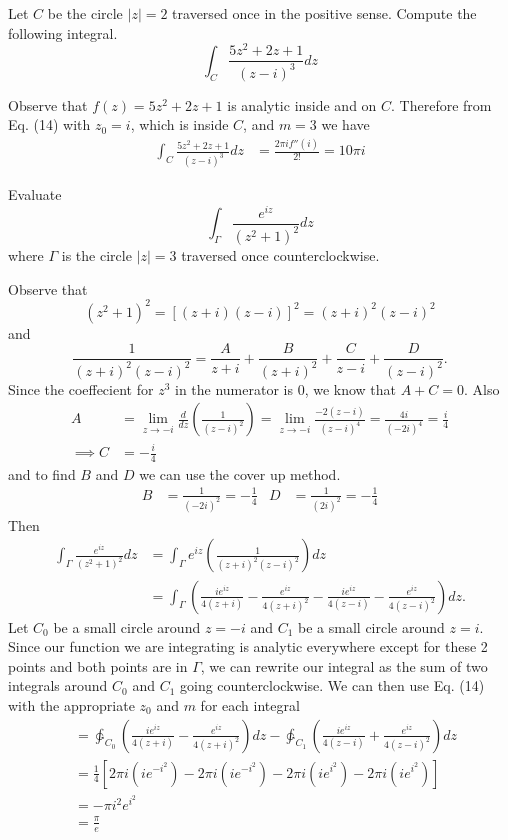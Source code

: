 \documentclass[12pt]{article}
\author{Warren Atkison}
\date{\today}
\newenvironment{exercise}[2][Exercise]{\begin{trivlist}
\item[\hskip \labelsep {\bfseries #1} \hskip \labelsep {\bfseries #2.}]}{\end{trivlist}}
\begin{document}
\fancyhf{}
\fancyhead[R]{\today}
\fancyfoot[R]{\thepage}

\begin{exercise}{3d}
	Let $C$ be the circle $|z| = 2$ traversed once in the positive sense. Compute the following integral.
	\[
		\int_{C} \frac{5z^2 + 2z + 1}{(z - i)^3}dz
	\]
\end{exercise}
Observe that $f(z) = 5z^2 + 2z + 1$ is analytic inside and on $C$. Therefore from Eq. (14) with $z_0 = i$, which is inside $C$, and $m = 3$ we have
\begin{align*}
	\int_{C} \frac{5z^2 + 2z + 1}{(z - i)^3}dz &= \frac{2\pi if''(i)}{2!} = 10\pi i
\end{align*}
\begin{exercise}{6}
	Evaluate
	\[
		\int_{\Gamma} \frac{e^{iz}}{\left(z^2 + 1\right)^2}dz
	\]
	where $\Gamma$ is the circle $|z| = 3$ traversed once counterclockwise.
\end{exercise}
Observe that
\[
	\left(z^2 + 1\right)^2 = \left[(z + i)(z - i)\right]^2 = (z + i)^2(z - i)^2
\]
and
\[
	\frac{1}{(z+i)^2(z-i)^2} = \frac{A}{z + i} + \frac{B}{(z + i)^2} + \frac{C}{z - i} + \frac{D}{(z - i)^2}.
\]
Since the coeffecient for $z^3$ in the numerator is 0, we know that $A + C = 0$. Also
\begin{align*}
	A &= \lim_{z \to -i} \frac{d}{dz}\left(\frac{1}{(z - i)^2}\right) = \lim_{z \to -i} \frac{-2(z - i)}{(z - i)^4} = \frac{4i}{(-2i)^4} = \frac{i}{4} \\
	\implies C &= -\frac{i}{4}
\end{align*}
and to find $B$ and $D$ we can use the cover up method.
\begin{align*}
	B &= \frac{1}{(-2i)^2} = -\frac{1}{4} & D &= \frac{1}{(2i)^2} = -\frac{1}{4}
\end{align*}
Then
\begin{align*}
	\int_{\Gamma} \frac{e^{iz}}{\left(z^2 + 1\right)^2}dz &= \int_{\Gamma} e^{iz}\left(\frac{1}{(z + i)^2(z - i)^2}\right)dz \\
							      &= \int_{\Gamma} \left(\frac{ie^{iz}}{4(z + i)} - \frac{e^{iz}}{4(z + i)^2} - \frac{ie^{iz}}{4(z - i)} - \frac{e^{iz}}{4(z - i)^2}\right)dz.
\end{align*}
Let $C_0$ be a small circle around $z = -i$ and $C_1$ be a small circle around $z = i$. Since our function we are integrating is analytic everywhere except for these 2 points and both points are in $\Gamma$, we can rewrite our integral as the sum of two integrals around $C_0$ and $C_1$ going counterclockwise. We can then use Eq. (14) with the appropriate $z_0$ and $m$ for each integral
\begin{align*}
	&= \ointctrclockwise_{C_0} \left(\frac{ie^{iz}}{4(z + i)} - \frac{e^{iz}}{4(z + i)^2}\right)dz - \ointctrclockwise_{C_1} \left(\frac{ie^{iz}}{4(z - i)} + \frac{e^{iz}}{4(z - i)^2}\right)dz \\
	&= \frac{1}{4}[2\pi i(ie^{-i^2}) - 2\pi i(ie^{-i^2}) - 2\pi i(ie^{i^2}) - 2\pi i (ie^{i^2})] \\
	&= -\pi i^2 e^{i^2} \\
	&= \frac{\pi}{e}
\end{align*}
\end{document}
